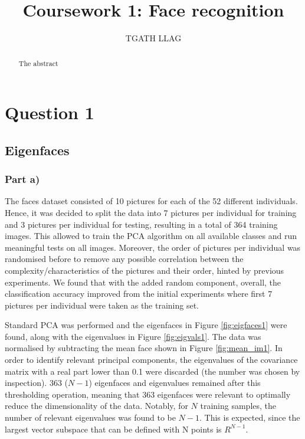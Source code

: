 \documentclass[10pt,technote]{IEEEtran}
\title{Coursework 1: Face recognition }
\author{TGATH LLAG}
\begin{document}
\maketitle
\begin{abstract}
The abstract
\end{abstract}

\section{Question 1}
\subsection{Eigenfaces}
\subsubsection{Part a)}
The faces dataset consisted of 10 pictures for each of the 52 different individuals. Hence, it was decided to split the data into 7 pictures per individual for training and 3 pictures per individual for testing, resulting in a total of 364 training images. This allowed to train the PCA algorithm on all available classes and run meaningful tests on all images. Moreover, the order of pictures per individual was randomised before to remove any possible correlation between the complexity/characteristics of the pictures and their order, hinted by previous experiments. We found that with the added random component, overall, the classification accuracy improved from the initial experiments where first 7  pictures per individual were taken as the training set.

Standard PCA was performed and the eigenfaces in Figure \ref{fig:eigfaces1} were found, along with the eigenvalues in Figure \ref{fig:eigvals1}. The data was normalised by subtracting the mean face shown in Figure \ref{fig:mean_im1}. In order to identify relevant principal components, the eigenvalues of the covariance matrix with a real part lower than 0.1 were discarded (the number was chosen by inspection). 363 ($N - 1$) eigenfaces and eigenvalues remained after this thresholding operation, meaning that 363 eigenfaces were relevant to optimally reduce the dimensionality of the data. Notably, for $N$ training samples, the number of relevant eigenvalues was found to be $N - 1$. This is expected, since the largest vector subspace that can be defined with N points is $R^{N-1}$.
\end{document}
